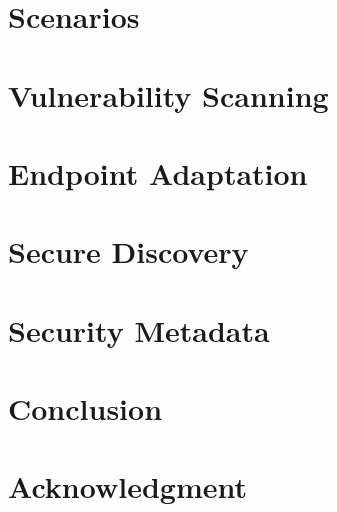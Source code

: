\documentclass[conference]{IEEEtran}
\begin{document}
\section{Scenarios}


\section{Vulnerability Scanning}


\section{Endpoint Adaptation}


\section{Secure Discovery}


\section{Security Metadata}


\section{Conclusion}


\section*{Acknowledgment}




\end{document}
